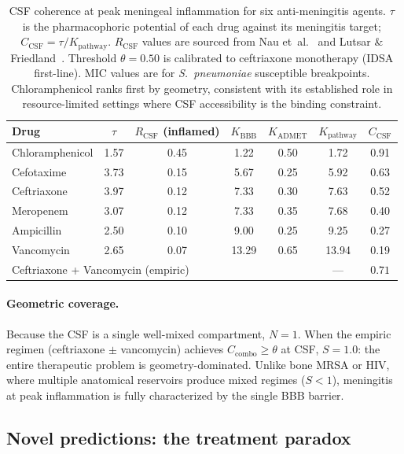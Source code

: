 \documentclass[11pt]{article}
\theoremstyle{plain}
\theoremstyle{definition}
\newcommand{\Kpath}{K_{\mathrm{pathway}}}
\newcommand{\Kadmet}{K_{\mathrm{ADMET}}}
\newcommand{\Ccombo}{C_{\mathrm{combo}}}
\begin{document}
\begin{table}[t]
\centering
\small
\begin{tabular}{lcccccc}
\toprule
\textbf{Drug} & $\tau$ & $R_{\mathrm{CSF}}$ (inflamed) &
  $K_{\mathrm{BBB}}$ & $\Kadmet$ &
  $\Kpath$ & $C_{\mathrm{CSF}}$ \\
\midrule
Chloramphenicol & 1.57 & 0.45 & 1.22 & 0.50 & 1.72 & 0.91 \\
Cefotaxime      & 3.73 & 0.15 & 5.67 & 0.25 & 5.92 & 0.63 \\
Ceftriaxone     & 3.97 & 0.12 & 7.33 & 0.30 & 7.63 & 0.52 \\
Meropenem       & 3.07 & 0.12 & 7.33 & 0.35 & 7.68 & 0.40 \\
Ampicillin      & 2.50 & 0.10 & 9.00 & 0.25 & 9.25 & 0.27 \\
Vancomycin      & 2.65 & 0.07 & 13.29 & 0.65 & 13.94 & 0.19 \\
\midrule
\multicolumn{5}{l}{Ceftriaxone + Vancomycin (empiric)} &
  --- & $0.71$ \\
\bottomrule
\end{tabular}
\caption{CSF coherence at peak meningeal inflammation for six
anti-meningitis agents. $\tau$ is the pharmacophoric potential
of each drug against its meningitis target; $C_{\mathrm{CSF}} =
\tau / \Kpath$. $R_{\mathrm{CSF}}$ values are sourced from
Nau et~al.~\cite{Nau2010} and Lutsar \&
Friedland~\cite{Lutsar2000}. Threshold $\theta = 0.50$ is
calibrated to ceftriaxone monotherapy (IDSA first-line). MIC values
are for \emph{S.\ pneumoniae} susceptible breakpoints. Chloramphenicol
ranks first by geometry, consistent with its established role in
resource-limited settings where CSF accessibility is the binding
constraint.}
\label{tab:men-results}
\end{table}

\paragraph{Geometric coverage.}
Because the CSF is a single well-mixed compartment, $N = 1$. When
the empiric regimen (ceftriaxone $\pm$ vancomycin) achieves
$\Ccombo \geq \theta$ at CSF, $S = 1.0$: the entire therapeutic
problem is geometry-dominated. Unlike bone MRSA or HIV, where
multiple anatomical reservoirs produce mixed regimes ($S < 1$),
meningitis at peak inflammation is fully
characterized by the single BBB barrier.

\subsection{Novel predictions: the treatment paradox}
\label{sec:men-predictions}
\end{document}
